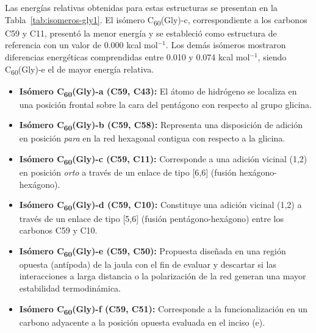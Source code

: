 Las energías relativas obtenidas para estas estructuras se presentan en la Tabla~\ref{tab:isomeros-gly1}. El isómero C\textsubscript{60}(Gly)-c, correspondiente a los carbonos C59 y C11, presentó la menor energía y se estableció como estructura de referencia con un valor de 0.000 kcal mol$^{-1}$. Los demás isómeros mostraron diferencias energéticas comprendidas entre 0.010 y 0.074 kcal mol$^{-1}$, siendo C\textsubscript{60}(Gly)-e el de mayor energía relativa.
        
  \begin{itemize}
    \item \textbf{Isómero C\textsubscript{60}(Gly)-a (C59, C43):} El átomo de hidrógeno se localiza en una posición frontal sobre la cara del pentágono con respecto al grupo glicina.
    \item \textbf{Isómero C\textsubscript{60}(Gly)-b (C59, C58):} Representa una disposición de adición en posición \textit{para} en la red hexagonal contigua con respecto a la glicina.
    \item \textbf{Isómero C\textsubscript{60}(Gly)-c (C59, C11):} Corresponde a una adición vicinal (1,2) en posición \textit{orto} a través de un enlace de tipo [6,6] (fusión hexágono-hexágono).
    \item \textbf{Isómero C\textsubscript{60}(Gly)-d (C59, C10):} Constituye una adición vicinal (1,2) a través de un enlace de tipo [5,6] (fusión pentágono-hexágono) entre los carbonos C59 y C10.
    \item \textbf{Isómero C\textsubscript{60}(Gly)-e (C59, C50):} Propuesta diseñada en una región opuesta (antípoda) de la jaula con el fin de evaluar y descartar si las interacciones a larga distancia o la polarización de la red generan una mayor estabilidad termodinámica.
    \item \textbf{Isómero C\textsubscript{60}(Gly)-f (C59, C51):} Corresponde a la funcionalización en un carbono adyacente a la posición opuesta evaluada en el inciso (e).
\end{itemize}


